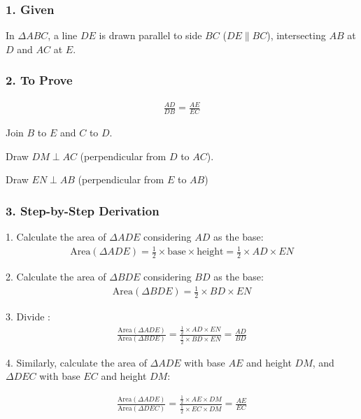 \begin{enumerate}[label=\thesubsection.\arabic*, ref=\thesubsection.\theenumi]
	
	\subsubsection*{1. Given}
	In $\Delta ABC$, a line $DE$ is drawn parallel to side $BC$ ($DE \parallel BC$), intersecting $AB$ at $D$ and $AC$ at $E$.
	
	\subsubsection*{2. To Prove}
	\begin{align}
		\frac{AD}{DB} = \frac{AE}{EC}
	\end{align}
	
	


		
		Join $B$ to $E$ and $C$ to $D$.
		
		  Draw $DM \perp AC$ (perpendicular from $D$ to $AC$).
		
		 Draw $EN \perp AB$ (perpendicular from $E$ to $AB$)
	
	\subsubsection*{3. Step-by-Step Derivation}
	
	
	
	1. Calculate the area of $\Delta ADE$ considering $AD$ as the base:
	\begin{align}
	\text{Area}(\Delta ADE) = \frac{1}{2} \times \text{base} \times \text{height} = \frac{1}{2} \times AD \times EN
	\end{align}
	
	2. Calculate the area of $\Delta BDE$ considering $BD$ as the base:
	\begin{align}
	\text{Area}(\Delta BDE) = \frac{1}{2} \times BD \times EN
	\end{align}
	
	3. Divide :
	\begin{align}
	\frac{\text{Area}(\Delta ADE)}{\text{Area}(\Delta BDE)} = \frac{\frac{1}{2} \times AD \times EN}{\frac{1}{2} \times BD \times EN} = \frac{AD}{BD} 
	\end{align}
	
	4. Similarly, calculate the area of $\Delta ADE$ with base $AE$ and height $DM$, and $\Delta DEC$ with base $EC$ and height $DM$:
	
	\begin{align}
	\frac{\text{Area}(\Delta ADE)}{\text{Area}(\Delta DEC)} = \frac{\frac{1}{2} \times AE \times DM}{\frac{1}{2} \times EC \times DM} = \frac{AE}{EC} 
	\end{align}
	

\end{enumerate}
